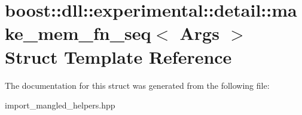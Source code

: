 \hypertarget{a00199}{}\section{boost\+:\+:dll\+:\+:experimental\+:\+:detail\+:\+:make\+\_\+mem\+\_\+fn\+\_\+seq$<$ Args $>$ Struct Template Reference}
\label{a00199}


The documentation for this struct was generated from the following file\+:\begin{DoxyCompactItemize}
\item 
import\+\_\+mangled\+\_\+helpers.\+hpp\end{DoxyCompactItemize}
